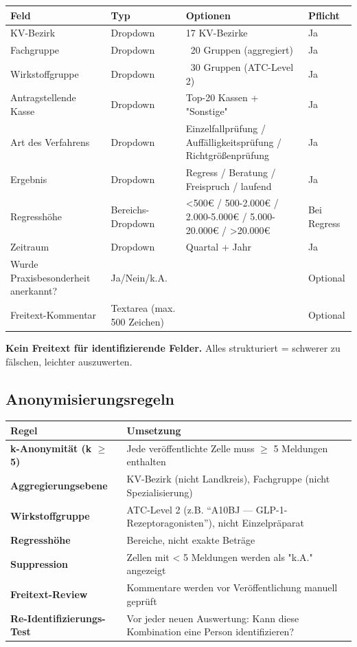 \documentclass{umbruch-position}
\begin{document}
{\small
\begin{tabularx}{\textwidth}{X X X X}
\toprule
\textbf{Feld} & \textbf{Typ} & \textbf{Optionen} & \textbf{Pflicht} \\
\midrule
KV-Bezirk & Dropdown & 17 KV-Bezirke & Ja \\
Fachgruppe & Dropdown & ~20 Gruppen (aggregiert) & Ja \\
Wirkstoffgruppe & Dropdown & ~30 Gruppen (ATC-Level 2) & Ja \\
Antragstellende Kasse & Dropdown & Top-20 Kassen + "Sonstige" & Ja \\
Art des Verfahrens & Dropdown & Einzelfallprüfung / Auffälligkeitsprüfung / Richtgrößenprüfung & Ja \\
Ergebnis & Dropdown & Regress / Beratung / Freispruch / laufend & Ja \\
Regresshöhe & Bereichs-Dropdown & <500€ / 500-2.000€ / 2.000-5.000€ / 5.000-20.000€ / >20.000€ & Bei Regress \\
Zeitraum & Dropdown & Quartal + Jahr & Ja \\
Wurde Praxisbesonderheit anerkannt? & Ja/Nein/k.A. &  & Optional \\
Freitext-Kommentar & Textarea (max. 500 Zeichen) &  & Optional \\
\bottomrule
\end{tabularx}
}


\textbf{Kein Freitext für identifizierende Felder.} Alles strukturiert = schwerer zu fälschen, leichter auszuwerten.

\subsection{Anonymisierungsregeln}

{\small
\begin{tabularx}{\textwidth}{X X}
\toprule
\textbf{Regel} & \textbf{Umsetzung} \\
\midrule
\textbf{k-Anonymität (k $\ge$ 5)} & Jede veröffentlichte Zelle muss $\ge$ 5 Meldungen enthalten \\
\textbf{Aggregierungsebene} & KV-Bezirk (nicht Landkreis), Fachgruppe (nicht Spezialisierung) \\
\textbf{Wirkstoffgruppe} & ATC-Level 2 (z.B. ``A10BJ --- GLP-1-Rezeptoragonisten''), nicht Einzelpräparat \\
\textbf{Regresshöhe} & Bereiche, nicht exakte Beträge \\
\textbf{Suppression} & Zellen mit < 5 Meldungen werden als "k.A." angezeigt \\
\textbf{Freitext-Review} & Kommentare werden vor Veröffentlichung manuell geprüft \\
\textbf{Re-Identifizierungs-Test} & Vor jeder neuen Auswertung: Kann diese Kombination eine Person identifizieren? \\
\bottomrule
\end{tabularx}
}
\end{document}

